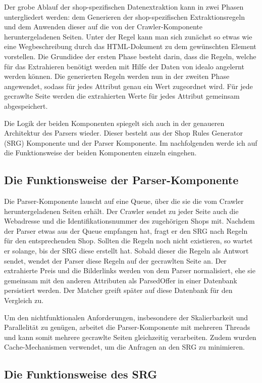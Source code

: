 Der grobe Ablauf der shop-spezifischen Datenextraktion kann in zwei Phasen untergliedert werden:
dem Generieren der shop-spezifischen Extraktionsregeln und dem Anwenden dieser auf die von der Crawler-Komponente
heruntergeladenen Seiten.
Unter der Regel kann man sich zunächst so etwas wie eine Wegbeschreibung durch das HTML-Dokument zu dem gewünschten
Element vorstellen.
Die Grundidee der ersten Phase besteht darin, dass die Regeln, welche für das Extrahieren benötigt werden mit
Hilfe der Daten von idealo angelernt werden können.
Die generierten Regeln werden nun in der zweiten Phase angewendet, sodass für jedes Attribut genau ein Wert
zugeordnet wird.
Für jede gecrawlte Seite werden die extrahierten Werte für jedes Attribut gemeinsam abgespeichert.

Die Logik der beiden Komponenten spiegelt sich auch in der genaueren Architektur des Parsers wieder.
Dieser besteht aus der Shop Rules Generator (SRG) Komponente und der Parser Komponente.
Im nachfolgenden werde ich auf die Funktionsweise der beiden Komponenten einzeln eingehen.

\subsection{Die Funktionsweise der Parser-Komponente}
\label{subsec:funktionsweise-parser}

Die Parser-Komponente lauscht auf eine Queue, über die sie die vom Crawler heruntergeladenen Seiten erhält.
Der Crawler sendet zu jeder Seite auch die Webadresse und die Identifikationsnummer des zugehörigen Shops mit.
Nachdem der Parser etwas aus der Queue empfangen hat, fragt er den SRG nach Regeln für den entsprechenden Shop.
Sollten die Regeln noch nicht existieren, so wartet er solange, bis der SRG diese erstellt hat.
Sobald dieser die Regeln als Antwort sendet, wendet der Parser diese Regeln auf der gecrawlten Seite an.
Der extrahierte Preis und die Bilderlinks werden von dem Parser normalisiert, ehe sie gemeinsam mit den anderen
Attributen als ParsedOffer in einer Datenbank persistiert werden.
Der Matcher greift später auf diese Datenbank für den Vergleich zu.

Um den nichtfunktionalen Anforderungen, insbesondere der Skalierbarkeit und Parallelität zu genügen, arbeitet die
Parser-Komponente mit mehreren Threads und kann somit mehrere gecrawlte Seiten gleichzeitig verarbeiten.
Zudem wurden Cache-Mechanismen verwendet, um die Anfragen an den SRG zu minimieren.


\subsection{Die Funktionsweise des SRG}
\label{subsec:funktionsweise-srg}

